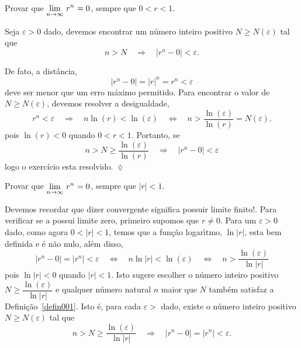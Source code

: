\begin{exer}
  Provar que $\displaystyle{\lim_{n\to \infty}\,{r^n}_{}}=0$, sempre que $0<r<1$.
\end{exer}

\solo Seja $\varepsilon>0$ dado, devemos encontrar um n\'{u}mero inteiro positivo $N\geq N(\varepsilon)$ tal que
\begin{equation*}
 n>N \quad \Rightarrow \quad |r^n-0|<\varepsilon.
\end{equation*}

De fato, a dist\^{a}ncia,
\begin{equation*}
|r^n-0|=|r|^n=r^n<\varepsilon
\end{equation*}
deve ser menor que um erro m\'{a}ximo permitido. Para encontrar o valor de $N\geq N(\varepsilon)$, devemos resolver a desigualdade,
\begin{equation*}
 r^n<\varepsilon\quad \Rightarrow\quad  n \ln(r) < \ln(\varepsilon) \quad \Leftrightarrow\quad n>\dfrac{\ln(\varepsilon)}{\ln(r)}=N(\varepsilon).
\end{equation*}
pois $\ln(r)<0$ quando $0<r<1$. Portanto, se
\begin{equation*}
    n>N\geq \dfrac{\ln(\varepsilon)}{\ln(r)}\quad \Rightarrow \quad |r^n-0|<\varepsilon
\end{equation*}
logo o exercício esta resolvido. \hfill \(\lozenge\)


\begin{exer}
 Provar que $\displaystyle{\lim_{n\to \infty}\,{r^n}_{}}=0$, sempre que $|r|<1$.
\end{exer}

\solo Devemos recordar que dizer convergente significa possuir limite finito!. Para verificar se a \seq possui limite zero, primeiro supomos que $r\neq 0$. Para um $\varepsilon>0$ dado, como agora $0<|r|<1$, temos que a fun\c{c}\~{a}o logar\'{\i}tmo, $\ln|r|$, esta bem definida e \'{e} n\~{a}o nulo, al\'{e}m disso,
\begin{equation*}
    |r^n-0|=|r^n|<\varepsilon\quad \Leftrightarrow\quad n\ln|r|<\ln(\varepsilon)\quad \Leftrightarrow \quad n>\dfrac{\ln(\varepsilon)}{\ln|r|}
\end{equation*}
pois $\ln|r|<0$ quando $|r|<1$. Isto sugere escolher o n\'{u}mero inteiro positivo $N\geq \dfrac{\ln(\varepsilon)}{\ln|r|}$ e qualquer n\'{u}mero natural $n$ maior que $N$ tamb\'{e}m satisfaz a Defini\c{c}\~{a}o~\ref{defin001}. Isto \'{e}, para cada $\varepsilon>$ dado, existe o n\'{u}mero inteiro positivo $N\geq N(\varepsilon)$ tal que
\begin{equation*}
    n>N\geq \dfrac{\ln(\varepsilon)}{\ln|r|}\quad \Rightarrow\quad  |r^n-0|=|r^n|<\varepsilon.
\end{equation*}

